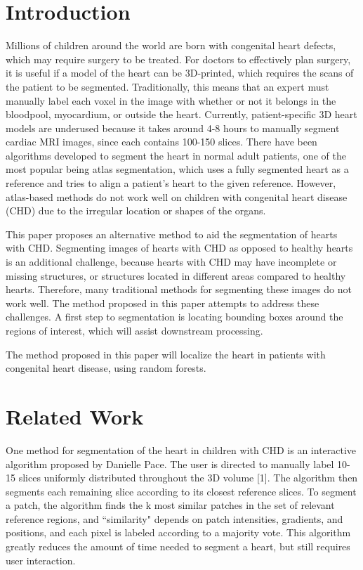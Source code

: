 \section{Introduction}
Millions of children around the world are born with congenital heart defects, which may require surgery to be treated. For doctors to effectively plan surgery, it is useful if a model of the heart can be 3D-printed, which requires the scans of the patient to be segmented. Traditionally, this means that an expert must manually label each voxel in the image with whether or not it belongs in the bloodpool, myocardium, or outside the heart. Currently, patient-specific 3D heart models are underused because it takes around 4-8 hours to manually segment cardiac MRI images, since each contains 100-150 slices. There have been algorithms developed to segment the heart in normal adult patients, one of the most popular being atlas segmentation, which uses a fully segmented heart as a reference and tries to align a patient's heart to the given reference. However, atlas-based methods do not work well on children with congenital heart disease (CHD) due to the irregular location or shapes of the organs.

This paper proposes an alternative method to aid the segmentation of hearts with CHD. Segmenting images of hearts with CHD as opposed to healthy hearts is an additional challenge, because hearts with CHD may have incomplete or missing structures, or structures located in different areas compared to healthy hearts. Therefore, many traditional methods for segmenting these images do not work well. The method proposed in this paper attempts to address these challenges. A first step to segmentation is locating bounding boxes around the regions of interest, which will assist downstream processing.

The method proposed in this paper will localize the heart in patients with congenital heart disease, using random forests.

\section{Related Work}
One method for segmentation of the heart in children with CHD is an interactive algorithm proposed by Danielle Pace. The user is directed to manually label 10-15 slices uniformly distributed throughout the 3D volume [1]. The algorithm then segments each remaining slice according to its closest reference slices. To segment a patch, the algorithm finds the k most similar patches in the set of relevant reference regions, and ``similarity" depends on patch intensities, gradients, and positions, and each pixel is labeled according to a majority vote. This algorithm greatly reduces the amount of time needed to segment a heart, but still requires user interaction.

